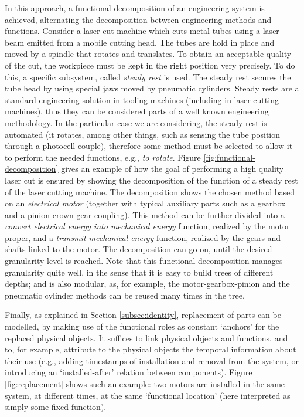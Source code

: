 \documentclass[
]{ceurart}
\begin{document}
In this approach, a functional decomposition of an engineering system is achieved, alternating the decomposition between engineering methods and functions. 
Consider a laser cut machine which cuts metal tubes using a laser beam emitted from a mobile cutting head. The tubes are hold in place and moved by a spindle that rotates and translates. To obtain an acceptable quality of the cut, the workpiece must be kept in the right position very precisely. To do this, a specific subsystem, called \textit{steady rest} is used. The steady rest secures the tube head by using special jaws moved by pneumatic cylinders. %
Steady rests are a standard engineering solution in tooling machines (including in laser cutting machines), thus they can be considered parts of a well known engineering methodology. In the particular case we are considering, the steady rest is automated (it rotates, among other things, such as sensing the tube position through a photocell couple), therefore some method must be selected to allow it to perform the needed functions, e.g., \textit{to rotate}. Figure \ref{fig:functional-decomposition} gives an example of how the goal of performing a high quality laser cut is ensured by showing the decomposition of the function of a steady rest of the laser cutting machine.
The decomposition shows the chosen method based on an \textit{electrical motor} (together with typical auxiliary parts such as a gearbox and a pinion-crown gear coupling). This method can be further divided into a \textit{convert electrical energy into mechanical energy} function, realized by the motor proper, and a \textit{transmit mechanical energy} function, realized by the gears and shafts linked to the motor. The decomposition can go on, until the desired granularity level is reached. 
Note that this functional decomposition manages granularity quite well, in the sense that it is easy to build trees of different depths; and is also modular, as, for example, the motor-gearbox-pinion and the pneumatic cylinder methods can be reused many times in the tree.

Finally, as explained in Section \ref{subsec:identity}, replacement of parts can be modelled, by making use of the functional roles as constant `anchors' for the replaced physical objects. It suffices to link physical objects and functions, and to, for example, attribute to the physical objects the temporal information about their use (e.g., adding timestamps of installation and removal from the system, or introducing an `installed-after' relation between components). Figure \ref{fig:replacement} shows such an example: two motors are installed in the same system, at different times, at the same `functional location' (here interpreted as simply some fixed function).
\end{document}
